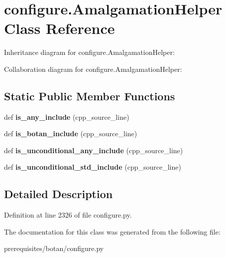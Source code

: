 \hypertarget{classconfigure_1_1_amalgamation_helper}{}\section{configure.\+Amalgamation\+Helper Class Reference}
\label{classconfigure_1_1_amalgamation_helper}


Inheritance diagram for configure.\+Amalgamation\+Helper\+:


Collaboration diagram for configure.\+Amalgamation\+Helper\+:
\subsection*{Static Public Member Functions}
\begin{DoxyCompactItemize}
\item 
\mbox{\label{classconfigure_1_1_amalgamation_helper_ab1eaa7a3e64764a74cbf31990e6cf078}} 
def {\bfseries is\+\_\+any\+\_\+include} (cpp\+\_\+source\+\_\+line)
\item 
\mbox{\label{classconfigure_1_1_amalgamation_helper_a3fc08af587acae2f55d95e3616f86b38}} 
def {\bfseries is\+\_\+botan\+\_\+include} (cpp\+\_\+source\+\_\+line)
\item 
\mbox{\label{classconfigure_1_1_amalgamation_helper_a0374db02f64aaeab4ce8f4b9248cc7c9}} 
def {\bfseries is\+\_\+unconditional\+\_\+any\+\_\+include} (cpp\+\_\+source\+\_\+line)
\item 
\mbox{\label{classconfigure_1_1_amalgamation_helper_a5efa83bd89d50db82e90170c4ea86cb6}} 
def {\bfseries is\+\_\+unconditional\+\_\+std\+\_\+include} (cpp\+\_\+source\+\_\+line)
\end{DoxyCompactItemize}


\subsection{Detailed Description}


Definition at line 2326 of file configure.\+py.



The documentation for this class was generated from the following file\+:\begin{DoxyCompactItemize}
\item 
prerequisites/botan/configure.\+py\end{DoxyCompactItemize}
